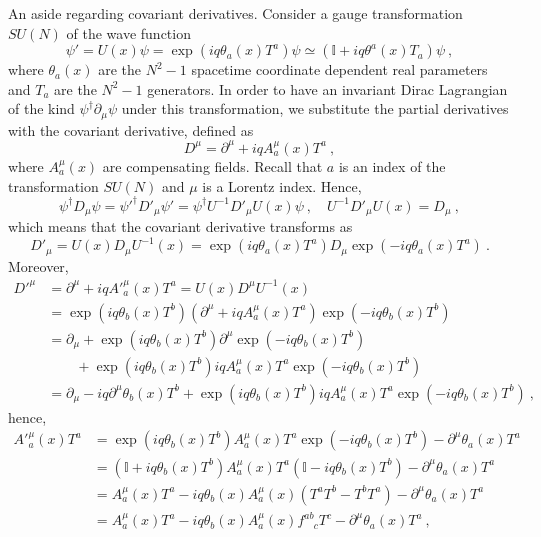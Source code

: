     An aside regarding covariant derivatives. Consider a gauge transformation $SU(N)$ of the wave function 
    \begin{equation*}
        \psi' = U(x) \psi = \exp(i q \theta_a (x) T^a) \psi \simeq (\mathbb I + i q \theta^a (x) T_a) \psi ~,
    \end{equation*}
    where $\theta_a (x)$ are the $N^2 - 1$ spacetime coordinate dependent real parameters and $T_a$ are the $N^2 - 1$ generators. In order to have an invariant Dirac Lagrangian of the kind $\psi^\dagger \partial_\mu \psi$ under this transformation, we substitute the partial derivatives with the covariant derivative, defined as 
    \begin{equation*}
        D^\mu = \partial^\mu + i q A^\mu_a (x) T^a ~,
    \end{equation*}
    where $A^\mu_a (x)$ are compensating fields. Recall that $a$ is an index of the transformation $SU(N)$ and $\mu$ is a Lorentz index. Hence, 
    \begin{equation*}
        \psi^\dagger D_\mu \psi = \psi'^\dagger D'_\mu \psi' = \psi^\dagger U^{-1} D'_\mu U(x) \psi ~, \quad U^{-1} D'_\mu U(x) = D_\mu ~,
    \end{equation*}
    which means that the covariant derivative transforms as
    \begin{equation*}
        D'_\mu = U(x) D_\mu U^{-1} (x) = \exp(i q \theta_a (x) T^a) D_\mu \exp(-i q \theta_a (x) T^a) ~.
    \end{equation*}
    Moreover, 
    \begin{equation*}
    \begin{aligned}
        D'^\mu & = \partial^\mu + i q A'^\mu_a (x) T^a = U(x) D^\mu U^{-1} (x) \\ & = \exp(i q \theta_b (x) T^b) (\partial^\mu + i q A^\mu_a (x) T^a) \exp(-i q \theta_b (x) T^b) \\ & = \partial_\mu + \exp(i q \theta_b (x) T^b) \partial^\mu \exp(-i q \theta_b (x) T^b) \\ & \qquad + \exp(i q \theta_b (x) T^b) i q A^\mu_a (x) T^a \exp(-i q \theta_b (x) T^b) \\ & = \partial_\mu - i q \partial^\mu \theta_b (x) T^b + \exp(i q \theta_b (x) T^b) i q A^\mu_a (x) T^a \exp(- i q \theta_b (x) T^b) ~,
    \end{aligned}
    \end{equation*}
    hence,
    \begin{equation*}
    \begin{aligned}
        A'^\mu_a (x) T^a & = \exp(i q \theta_b (x) T^b) A^\mu_a (x) T^a \exp(- i q \theta_b (x) T^b) - \partial^\mu \theta_a (x) T^a \\ & = (\mathbb I + i q \theta_b (x) T^b) A^\mu_a (x) T^a (\mathbb I - i q \theta_b (x) T^b) - \partial^\mu \theta_a (x) T^a \\ & = A^\mu_a (x) T^a - i q \theta_b (x) A^\mu_a (x) (T^a T^b - T^b T^a) - \partial^\mu \theta_a (x) T^a \\ & = A^\mu_a (x) T^a - i q \theta_b (x) A^\mu_a (x) f^{ab}_{\phantom{ab} c} T^c - \partial^\mu \theta_a (x) T^a ~,
    \end{aligned}
    \end{equation*}
